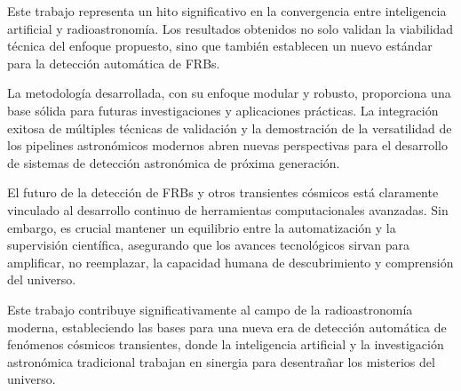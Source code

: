 Este trabajo representa un hito significativo en la convergencia entre inteligencia artificial y radioastronomía. Los resultados obtenidos no solo validan la viabilidad técnica del enfoque propuesto, sino que también establecen un nuevo estándar para la detección automática de FRBs.

La metodología desarrollada, con su enfoque modular y robusto, proporciona una base sólida para futuras investigaciones y aplicaciones prácticas. La integración exitosa de múltiples técnicas de validación y la demostración de la versatilidad de los pipelines astronómicos modernos abren nuevas perspectivas para el desarrollo de sistemas de detección astronómica de próxima generación.

El futuro de la detección de FRBs y otros transientes cósmicos está claramente vinculado al desarrollo continuo de herramientas computacionales avanzadas. Sin embargo, es crucial mantener un equilibrio entre la automatización y la supervisión científica, asegurando que los avances tecnológicos sirvan para amplificar, no reemplazar, la capacidad humana de descubrimiento y comprensión del universo.

Este trabajo contribuye significativamente al campo de la radioastronomía moderna, estableciendo las bases para una nueva era de detección automática de fenómenos cósmicos transientes, donde la inteligencia artificial y la investigación astronómica tradicional trabajan en sinergia para desentrañar los misterios del universo.
